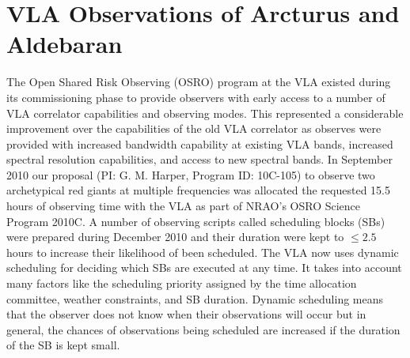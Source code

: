 \section{VLA Observations of Arcturus and Aldebaran}\label{sec:3.6}
The Open Shared Risk Observing (OSRO) program at the VLA existed during its commissioning phase to provide observers with early access to a number of VLA correlator capabilities and observing modes. This represented a considerable improvement over the capabilities of the old VLA correlator as observes were provided with increased bandwidth capability at existing VLA bands, increased spectral resolution capabilities, and access to new spectral bands. In September 2010 our proposal (PI: G. M. Harper, Program ID: 10C-105) to observe two archetypical red giants at multiple frequencies was allocated the requested 15.5 hours of observing time with the VLA as part of NRAO's OSRO Science Program 2010C. A number of observing scripts called scheduling blocks (SBs) were prepared during December 2010 and their duration were kept to $\leq 2.5$ hours to increase their likelihood of been scheduled. The VLA now uses dynamic scheduling for deciding which SBs are executed at any time. It takes into account many factors like the scheduling priority assigned by the time allocation committee, weather constraints, and SB duration. Dynamic scheduling means that the observer does not know when their observations will occur but in general, the chances of observations being scheduled are increased if the duration of the SB is kept small.

